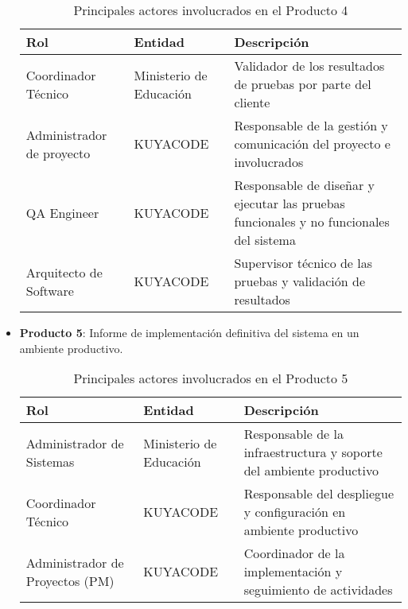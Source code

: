 \begin{itemize}
    \begin{table}[htbp]
        \centering
        \begin{tabular}{|p{3cm}|p{5cm}|p{7cm}|}
            \hline
            \textbf{Rol} & \textbf{Entidad} & \textbf{Descripción} \\
            \hline
            Coordinador Técnico & Ministerio de Educación & Validador de los resultados de pruebas por parte del cliente \\
            \hline
            Administrador de proyecto & KUYACODE & Responsable de la gestión y comunicación del proyecto e involucrados \\
            \hline
            QA Engineer & KUYACODE & Responsable de diseñar y ejecutar las pruebas funcionales y no funcionales del sistema \\
            \hline
            Arquitecto de Software & KUYACODE & Supervisor técnico de las pruebas y validación de resultados \\
            \hline
        \end{tabular}
        \caption{Principales actores involucrados en el Producto 4}
        \label{tab:actores_producto4}
    \end{table}

    \item \textbf{Producto 5}: Informe de implementación definitiva del sistema en un ambiente productivo.\\
    
    \begin{table}[h]            
        \centering
        \begin{tabular}{|p{3cm}|p{5cm}|p{7cm}|}
            \hline
            \textbf{Rol} & \textbf{Entidad} & \textbf{Descripción} \\
            \hline
            Administrador de Sistemas & Ministerio de Educación & Responsable de la infraestructura y soporte del ambiente productivo \\
            \hline
            Coordinador Técnico & KUYACODE & Responsable del despliegue y configuración en ambiente productivo \\
            \hline
            Administrador de Proyectos (PM) & KUYACODE & Coordinador de la implementación y seguimiento de actividades \\
            \hline
        \end{tabular}   
        \caption{Principales actores involucrados en el Producto 5}
        \label{tab:actores_producto5}
    \end{table}


\end{itemize}
